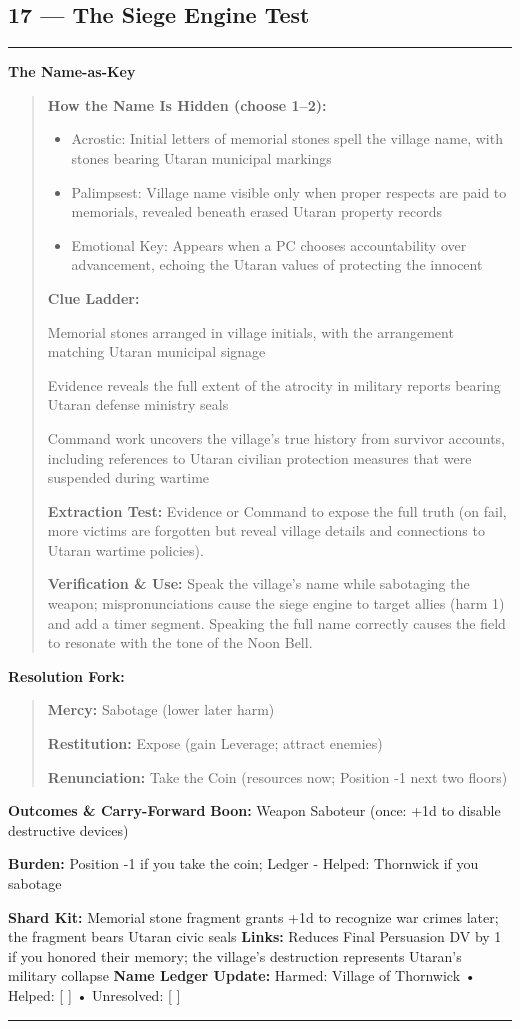 \documentclass[18pt, letterpaper, twoside]{article}
\newenvironment{floorbox}[1]{%
    \begin{center}
    \begin{minipage}{0.95\textwidth}
    \subsection*{#1}
    \vspace{-0.5em}
    \rule{\textwidth}{0.5pt}
    \vspace{0.5em}
}{%
    \vspace{0.5em}
    \rule{\textwidth}{0.5pt}
    \end{minipage}
    \end{center}
}
\newenvironment{gmnote}[1]{%
    \vspace{0.5em}
    \noindent\textbf{#1}
    \begin{quote}
}{%
    \end{quote}
    \vspace{0.5em}
}
\newenvironment{resolutionbox}{%
    \vspace{0.5em}
    \noindent\textbf{Resolution Fork:}
    \begin{quote}
}{%
    \end{quote}
    \vspace{0.5em}
}
\newcommand{\boon}[1]{\noindent\textbf{Boon:} #1\par}
\newcommand{\burden}[1]{\noindent\textbf{Burden:} #1\par}
\begin{document}
\begin{floorbox}{17 --- The Siege Engine Test}
\begin{gmnote}{The Name-as-Key}
\textbf{How the Name Is Hidden (choose 1--2):}
\begin{itemize}[leftmargin=*]
    \item Acrostic: Initial letters of memorial stones spell the village name, with stones bearing Utaran municipal markings
    \item Palimpsest: Village name visible only when proper respects are paid to memorials, revealed beneath erased Utaran property records
    \item Emotional Key: Appears when a PC chooses accountability over advancement, echoing the Utaran values of protecting the innocent
\end{itemize}

\textbf{Clue Ladder:}
\begin{description}[leftmargin=*, style=unboxed]
    \item[Gentle Nudge:] Memorial stones arranged in village initials, with the arrangement matching Utaran municipal signage
    \item[Actionable Lead:] Evidence reveals the full extent of the atrocity in military reports bearing Utaran defense ministry seals
    \item[Aha! Proof:] Command work uncovers the village's true history from survivor accounts, including references to Utaran civilian protection measures that were suspended during wartime
\end{description}

\textbf{Extraction Test:} Evidence or Command to expose the full truth (on fail, more victims are forgotten but reveal village details and connections to Utaran wartime policies).

\textbf{Verification \& Use:} Speak the village's name while sabotaging the weapon; mispronunciations cause the siege engine to target allies (harm 1) and add a timer segment. Speaking the full name correctly causes the field to resonate with the tone of the Noon Bell.
\end{gmnote}

\begin{resolutionbox}
\textbf{Mercy:} Sabotage (lower later harm)

\textbf{Restitution:} Expose (gain Leverage; attract enemies)

\textbf{Renunciation:} Take the Coin (resources now; Position -1 next two floors)
\end{resolutionbox}

\textbf{Outcomes \& Carry-Forward}
\boon{Weapon Saboteur (once: +1d to disable destructive devices)}
\burden{Position -1 if you take the coin; Ledger - Helped: Thornwick if you sabotage}
\textbf{Shard Kit:} Memorial stone fragment grants +1d to recognize war crimes later; the fragment bears Utaran civic seals
\textbf{Links:} Reduces Final Persuasion DV by 1 if you honored their memory; the village's destruction represents Utaran's military collapse
\textbf{Name Ledger Update:} Harmed: Village of Thornwick • Helped: [ ] • Unresolved: [ ]


\end{floorbox}
\end{document}
